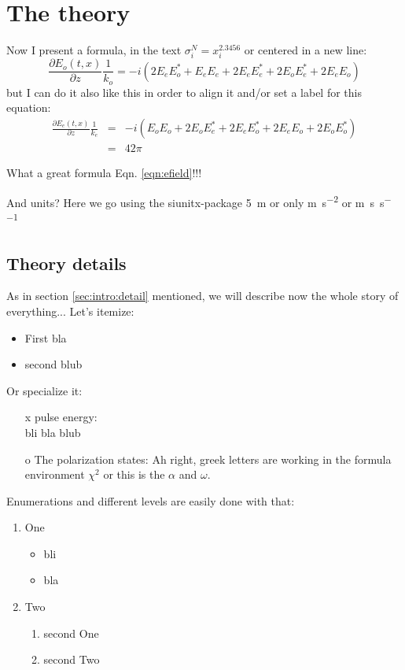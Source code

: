 \documentclass[12pt,oneside,notitlepage,abstracton,a4paper]{scrartcl}
\begin{document}

\section{The theory}
\label{sec:theory}

Now I present a formula, in the text $\sigma_i^N = x_i^{2.3456}$ or centered in a new line:
$$\frac{\partial E_o(t,x)}{\partial z}\frac{1}{k_o}=-i(2E_eE_o^*+E_eE_e+2E_eE_e^*+2E_oE_e^*+2E_eE_o)$$
but I can do it also like this in order to align it and/or set a label for this equation:
\begin{eqnarray}
\frac{\partial E_e(t,x)}{\partial z}\frac{1}{k_e} & = & -i(E_oE_o+2E_oE_e^*+2E_eE_o^*+2E_eE_o+2E_oE_o^*) \\
& = & 42\pi %
\label{eqn:efield}
\end{eqnarray}

What a great formula Eqn. \ref{eqn:efield}!!!

And units? Here we go using the siunitx-package \SI{5}{\meter} or only \si{\meter\per\second^2} or \si{\meter\per\second\per\second}


\subsection{Theory details}
As in section \ref{sec:intro:detail} mentioned, we will describe now the whole story of everything... Let's itemize:
\begin{itemize}
\item First bla
\item second blub
\end{itemize}
Or specialize it:
\begin{itemize}
\item[x]{pulse energy:} \\ %
bli bla blub
\item[o]{The polarization states:}
Ah right, greek letters are working in the formula environment $\chi^2$ or this is the $\alpha$ and $\omega$.
\end{itemize}

Enumerations and different levels are easily done with that:
\begin{enumerate}
\item One 
\begin{itemize}
\item bli 
\item bla 
\end{itemize}
\item Two
\begin{enumerate}
\item second One
\item second Two
\end{enumerate}
\end{enumerate}
\end{document}
